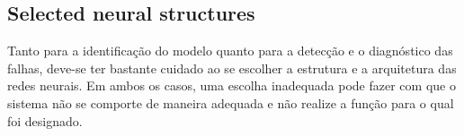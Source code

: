 \documentclass[10pt,fleqn,a4paper]{article}
\begin{document}

\subsection{Selected neural structures}
Tanto para a identificação do modelo quanto para a detecção e o diagnóstico das
falhas, deve-se ter bastante cuidado ao se escolher a estrutura e a arquitetura
das redes neurais. Em ambos os casos, uma escolha inadequada pode fazer com que
o sistema não se comporte de maneira adequada e não realize a função para o qual
foi designado.
\end{document}

